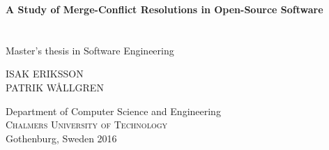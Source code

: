 \begin{titlepage}
			
\addtolength{\voffset}{2cm}

\begin{figure}[H]
\centering
\vspace{2cm}	%
\end{figure}

\mbox{}
\vfill
\renewcommand{\familydefault}{\sfdefault} \normalfont %
\textbf{{\Huge 	A Study of Merge-Conflict Resolutions in Open-Source Software 	\\[0.2cm] 
				}} 	\\[0.5cm]
{\Large }\\[0.5cm]
Master's thesis in Software Engineering \setlength{\parskip}{1cm}

{\Large ISAK ERIKSSON\\PATRIK WÅLLGREN} \setlength{\parskip}{2.9cm}

Department of Computer Science and Engineering \\
\textsc{Chalmers University of Technology} \\
Gothenburg, Sweden 2016

\renewcommand{\familydefault}{\rmdefault} \normalfont %
\end{titlepage}


\newpage
\restoregeometry
\thispagestyle{empty}
\mbox{}


